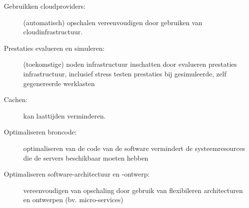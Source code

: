 \begin{description}
    \item [Gebruikken cloudproviders:] (automatisch) opschalen vereenvoudigen
    door gebruiken van cloudinfrastructuur.

    \item [Prestaties evalueren en simuleren:] (toekomstige) noden infrastructuur
    inschatten door evalueren prestaties infrastructuur, inclusief
    stress testen prestaties bij gesimuleerde, zelf gegenereerde
    werklasten 

    \item [Cachen:] kan laattijden verminderen.

    \item [Optimaliseren broncode:] optimaliseren van de code van de software
    vermindert de systeemresources die de servers beschikbaar moeten hebben

    \item [Optimaliseren software-architectuur en -ontwerp:] vereenvoudigen van
    opschaling door gebruik van flexibileren architecturen en ontwerpen 
    (bv. micro-services)

\end{description}


